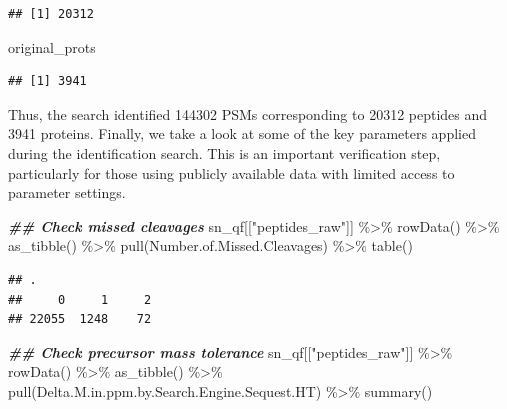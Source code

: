 \documentclass[9pt,a4paper,]{extarticle}
\newenvironment{Shaded}{\begin{snugshade}}{\end{snugshade}}
\newcommand{\DocumentationTok}[1]{\textcolor[rgb]{0.56,0.35,0.01}{\textbf{\textit{#1}}}}
\newcommand{\FunctionTok}[1]{\textcolor[rgb]{0.00,0.00,0.00}{#1}}
\newcommand{\NormalTok}[1]{#1}
\newcommand{\SpecialCharTok}[1]{\textcolor[rgb]{0.00,0.00,0.00}{#1}}
\newcommand{\StringTok}[1]{\textcolor[rgb]{0.31,0.60,0.02}{#1}}
\begin{document}
\begin{verbatim}
## [1] 20312
\end{verbatim}

\begin{Shaded}
\begin{Highlighting}[]
\NormalTok{original\_prots}
\end{Highlighting}
\end{Shaded}

\begin{verbatim}
## [1] 3941
\end{verbatim}

Thus, the search identified 144302 PSMs
corresponding to 20312 peptides and
3941 proteins. Finally, we take a look at some of the key
parameters applied during the identification search. This is an important
verification step, particularly for those using publicly available data with
limited access to parameter settings.

\begin{Shaded}
\begin{Highlighting}[]
\DocumentationTok{\#\# Check missed cleavages}
\NormalTok{sn\_qf[[}\StringTok{"peptides\_raw"}\NormalTok{]] }\SpecialCharTok{\%\textgreater{}\%}
  \FunctionTok{rowData}\NormalTok{() }\SpecialCharTok{\%\textgreater{}\%} 
  \FunctionTok{as\_tibble}\NormalTok{() }\SpecialCharTok{\%\textgreater{}\%} 
  \FunctionTok{pull}\NormalTok{(Number.of.Missed.Cleavages) }\SpecialCharTok{\%\textgreater{}\%} 
  \FunctionTok{table}\NormalTok{()}
\end{Highlighting}
\end{Shaded}

\begin{verbatim}
## .
##     0     1     2 
## 22055  1248    72
\end{verbatim}

\begin{Shaded}
\begin{Highlighting}[]
\DocumentationTok{\#\# Check precursor mass tolerance}
\NormalTok{sn\_qf[[}\StringTok{"peptides\_raw"}\NormalTok{]] }\SpecialCharTok{\%\textgreater{}\%}
  \FunctionTok{rowData}\NormalTok{() }\SpecialCharTok{\%\textgreater{}\%} 
  \FunctionTok{as\_tibble}\NormalTok{() }\SpecialCharTok{\%\textgreater{}\%} 
  \FunctionTok{pull}\NormalTok{(Delta.M.in.ppm.by.Search.Engine.Sequest.HT) }\SpecialCharTok{\%\textgreater{}\%} 
  \FunctionTok{summary}\NormalTok{()}
\end{Highlighting}
\end{Shaded}
\end{document}
